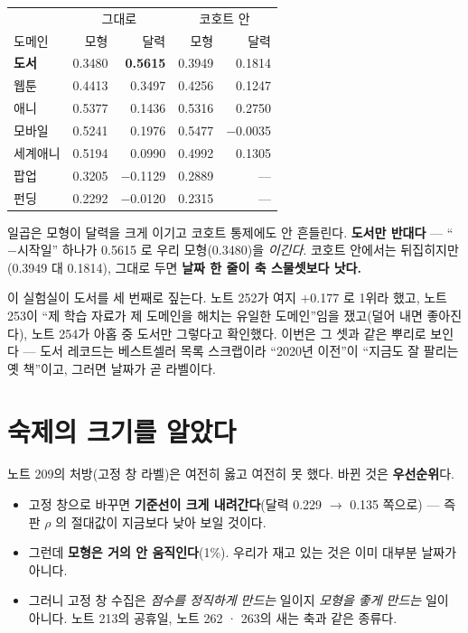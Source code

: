 \documentclass[10pt]{article}
\begin{document}
\begin{center}\small
\begin{tabular}{lrrrr}
\hline
 & \multicolumn{2}{c}{그대로} & \multicolumn{2}{c}{코호트 안} \\
도메인 & 모형 & 달력 & 모형 & 달력 \\
\hline
\textbf{도서} & 0.3480 & \textbf{0.5615} & 0.3949 & 0.1814 \\
웹툰 & 0.4413 & 0.3497 & 0.4256 & 0.1247 \\
애니 & 0.5377 & 0.1436 & 0.5316 & 0.2750 \\
모바일 & 0.5241 & 0.1976 & 0.5477 & $-$0.0035 \\
세계애니 & 0.5194 & 0.0990 & 0.4992 & 0.1305 \\
팝업 & 0.3205 & $-$0.1129 & 0.2889 & --- \\
펀딩 & 0.2292 & $-$0.0120 & 0.2315 & --- \\
\hline
\end{tabular}
\end{center}

일곱은 모형이 달력을 크게 이기고 코호트 통제에도 안 흔들린다. \textbf{도서만
반대다} --- ``$-$시작일'' 하나가 0.5615 로 우리 모형(0.3480)을 \emph{이긴다}.
코호트 안에서는 뒤집히지만(0.3949 대 0.1814), 그대로 두면 \textbf{날짜 한
줄이 축 스물셋보다 낫다.}

이 실험실이 도서를 세 번째로 짚는다. 노트 252가 여지 $+$0.177 로 1위라
했고, 노트 253이 ``제 학습 자료가 제 도메인을 해치는 유일한 도메인''임을
쟀고(덜어 내면 좋아진다), 노트 254가 아홉 중 도서만 그렇다고 확인했다.
이번은 그 셋과 같은 뿌리로 보인다 --- 도서 레코드는 베스트셀러 목록
스크랩이라 ``2020년 이전''이 ``지금도 잘 팔리는 옛 책''이고, 그러면 날짜가
곧 라벨이다.

\section{숙제의 크기를 알았다}

노트 209의 처방(고정 창 라벨)은 여전히 옳고 여전히 못 했다. 바뀐 것은
\textbf{우선순위}다.

\begin{itemize}
\item 고정 창으로 바꾸면 \textbf{기준선이 크게 내려간다}(달력 0.229 $\to$
0.135 쪽으로) --- 즉 판 $\rho$ 의 절대값이 지금보다 낮아 보일 것이다.
\item 그런데 \textbf{모형은 거의 안 움직인다}(1\%). 우리가 재고 있는 것은
이미 대부분 날짜가 아니다.
\item 그러니 고정 창 수집은 \emph{점수를 정직하게 만드는} 일이지
\emph{모형을 좋게 만드는} 일이 아니다. 노트 213의 공휴일, 노트 262 · 263의
새는 축과 같은 종류다.
\end{itemize}
\end{document}

